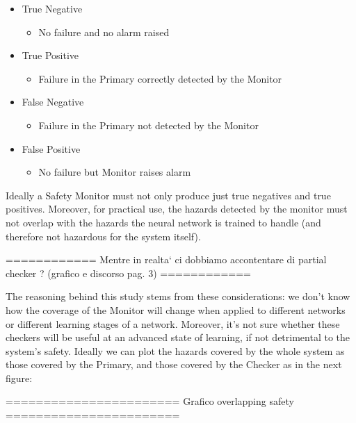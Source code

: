 \begin{itemize}
	\item True Negative
	\begin{itemize}
		\item No failure and no alarm raised
	\end{itemize}
	\item True Positive
	\begin{itemize}
		\item Failure in the Primary correctly detected by the Monitor
	\end{itemize}
	\item False Negative
	\begin{itemize}
		\item Failure in the Primary not detected by the Monitor
	\end{itemize}
	\item False Positive
	\begin{itemize}
		\item No failure but Monitor raises alarm
	\end{itemize}
\end{itemize}

Ideally a Safety Monitor must not only produce just true negatives and true positives. Moreover, for practical use, the hazards detected by the monitor must not overlap with the hazards the neural network is trained to handle (and therefore not hazardous for the system itself).\newline

============\newline
Mentre in realta` ci dobbiamo accontentare di partial checker ? (grafico e discorso pag. 3)\newline
============\newline

The reasoning behind this study stems from these considerations: we don't know how the coverage of the Monitor will change when applied to different networks or different learning stages of a network. Moreover, it's not sure whether these checkers will be useful at an advanced state of learning, if not detrimental to the system's safety.\newline
Ideally we can plot the hazards covered by the whole system as those covered by the Primary, and those covered by the Checker as in the next figure:

======================= \newline
Grafico overlapping safety \newline
======================= \newline

